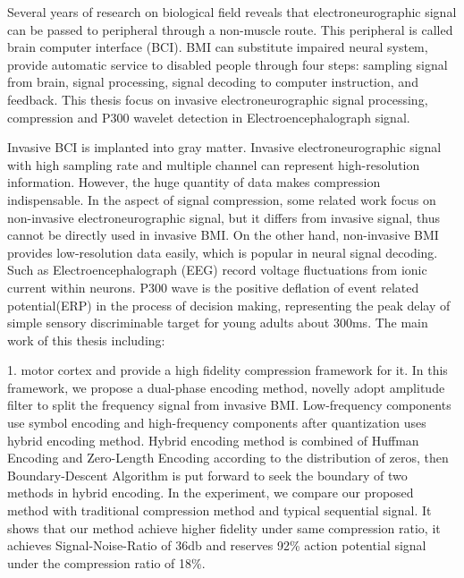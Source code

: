 \begin{englishabstract}

Several years of research on biological field reveals that electroneurographic signal can be passed to peripheral through a non-muscle route. This peripheral is called brain computer interface (BCI). BMI can substitute impaired neural system, provide automatic service to disabled people through four steps: sampling signal from brain, signal processing, signal decoding to computer instruction, and feedback. This thesis focus on invasive electroneurographic signal processing, compression and P300 wavelet detection in Electroencephalograph signal. 

Invasive BCI is implanted into gray matter. Invasive electroneurographic signal with high sampling rate and multiple channel can represent high-resolution information. However, the huge quantity of data makes compression indispensable. 
In the aspect of signal compression, some related work focus on non-invasive electroneurographic signal, but it differs from invasive signal, thus cannot be directly used in invasive BMI. On the other hand, non-invasive BMI provides low-resolution data easily, which is popular in  neural signal decoding. Such as Electroencephalograph 
(EEG) record voltage fluctuations from ionic current within neurons. P300 wave is the positive deflation of event related potential(ERP) in the process of decision making, representing the peak delay of simple sensory discriminable target for young adults about 300ms. The main work of this thesis including: 

1. motor cortex and provide a high fidelity compression framework for it. In this framework, we propose a dual-phase encoding method,  novelly adopt amplitude filter to split the frequency signal from invasive BMI. Low-frequency components use symbol encoding and high-frequency components after quantization uses hybrid encoding method. Hybrid encoding method is combined of Huffman Encoding and Zero-Length Encoding according to the distribution of zeros, then Boundary-Descent Algorithm is put forward to seek the boundary of two methods in hybrid encoding. In the experiment, we compare our proposed method with traditional compression method and typical sequential signal. It shows that our method achieve higher fidelity under same compression ratio, it achieves Signal-Noise-Ratio of 36db and reserves 92\% action potential signal under the compression ratio of 18\%.


\end{englishabstract}
